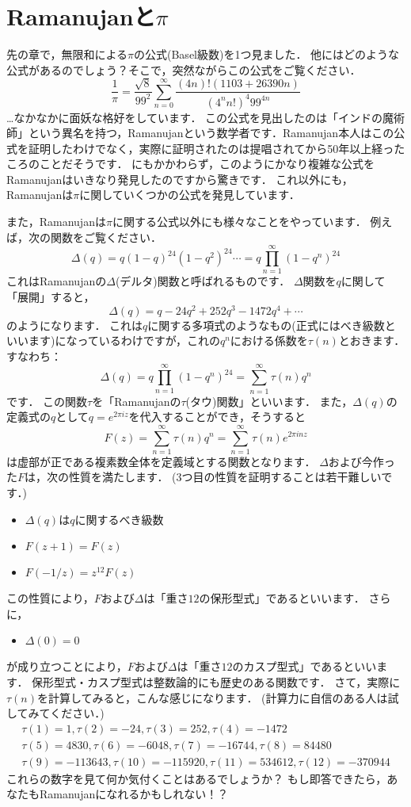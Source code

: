 \section{Ramanujanと$\pi$}
先の章で，無限和による$\pi$の公式(Basel級数)を1つ見ました．
他にはどのような公式があるのでしょう？そこで，突然ながらこの公式をご覧ください．
\[
\frac{1}{\pi}=\frac{\sqrt{8}}{99^2} \sum_{n=0}^{\infty}\frac{(4n)! (1103+26390n)}{(4^{n}n!)^{4}99^{4n}}
\]
…なかなかに面妖な格好をしています．
この公式を見出したのは「インドの魔術師」という異名を持つ，Ramanujanという数学者です．Ramanujan本人はこの公式を証明したわけでなく，実際に証明されたのは提唱されてから50年以上経ったころのことだそうです．
にもかかわらず，このようにかなり複雑な公式をRamanujanはいきなり発見したのですから驚きです．
これ以外にも，Ramanujanは$\pi$に関していくつかの公式を発見しています．

また，Ramanujanは$\pi$に関する公式以外にも様々なことをやっています．
例えば，次の関数をご覧ください．
\[
  \Delta (q)=q(1-q)^{24}(1-q^{2})^{24} \cdots = q\prod_{n=1}^{\infty}(1-q^n)^{24}
\]
これはRamanujanの$\Delta$(デルタ)関数と呼ばれるものです．
$\Delta$関数を$q$に関して「展開」すると，
\[
	\Delta (q)=q-24q^{2}+252q^{3}-1472q^{4}+\cdots
\]
のようになります．
これは$q$に関する多項式のようなもの(正式にはべき級数といいます)になっているわけですが，これの$q^n$における係数を$\tau (n)$とおきます．
すなわち：
\[
	\Delta (q)=q\prod_{n=1}^{\infty}(1-q^n)^{24} = \sum_{n=1}^{\infty} \tau (n) q^{n}
\]
です．
この関数$\tau$を「Ramanujanの$\tau$(タウ)関数」といいます．
また，$\Delta(q)$の定義式の$q$として$q=e^{2\pi iz}$を代入することができ，そうすると
\[
	F(z)=\sum_{n=1}^{\infty} \tau (n) q^{n}=\sum_{n=1}^{\infty} \tau (n) e^{2 \pi inz}
\]
は虚部が正である複素数全体を定義域とする関数となります．
$\Delta$および今作った$F$は，次の性質を満たします．
(3つ目の性質を証明することは若干難しいです．)
\begin{itemize}
	\item $\Delta (q)$は$q$に関するべき級数
	\item $F(z+1)=F(z)$
	\item $F(-1/z)=z^{12} F(z)$
\end{itemize}
この性質により，$F$および$\Delta$は「重さ$12$の保形型式」であるといいます．
さらに，
\begin{itemize}
	\item $\Delta(0)=0$
\end{itemize}
が成り立つことにより，$F$および$\Delta$は「重さ$12$のカスプ型式」であるといいます．
保形型式・カスプ型式は整数論的にも歴史のある関数です．
さて，実際に$\tau (n)$を計算してみると，こんな感じになります．
(計算力に自信のある人は試してみてください．)
\begin{gather*}
\tau(1)=1, \tau(2)=-24, \tau(3)=252, \tau(4)=-1472 \\
\tau (5)=4830, \tau(6)=-6048, \tau(7)=-16744, \tau(8)=84480 \\
\tau(9)=-113643, \tau(10)=-115920, \tau(11)=534612, \tau(12)=-370944
\end{gather*}
これらの数字を見て何か気付くことはあるでしょうか？
もし即答できたら，あなたもRamanujanになれるかもしれない！？

